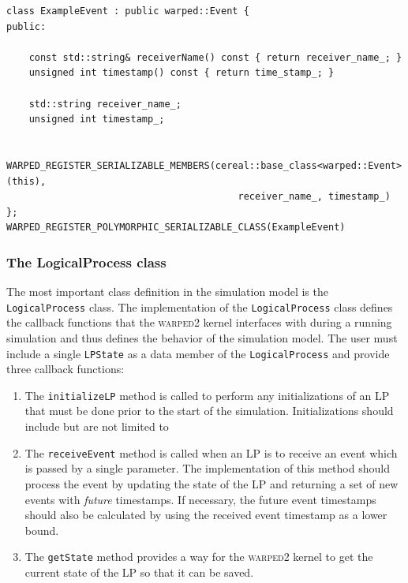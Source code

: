 \documentclass[11pt]{book}
\begin{document}
\begin{lstlisting}[caption=Example \textsc{warped2} Event Definition, label=event_example, float]
class ExampleEvent : public warped::Event {
public:

    const std::string& receiverName() const { return receiver_name_; }
    unsigned int timestamp() const { return time_stamp_; }

    std::string receiver_name_;
    unsigned int timestamp_;

    WARPED_REGISTER_SERIALIZABLE_MEMBERS(cereal::base_class<warped::Event>(this),
                                         receiver_name_, timestamp_)
};
WARPED_REGISTER_POLYMORPHIC_SERIALIZABLE_CLASS(ExampleEvent)
\end{lstlisting}

\subsubsection{The LogicalProcess class}

The most important class definition in the simulation model is the \texttt{LogicalProcess} class.
The implementation of the \texttt{LogicalProcess} class defines the callback functions that the
\textsc{warped2} kernel interfaces with during a running simulation and thus defines the behavior
of the simulation model. The user must include a single \texttt{LPState} as a data member of the
\texttt{LogicalProcess} and provide three callback functions:

\begin{enumerate}
    \item The \texttt{initializeLP} method is called to perform any initializations of an LP that
        must be done prior to the start of the simulation.  Initializations should include
        but are not limited to 
    \item The \texttt{receiveEvent} method is called when an LP is to receive an event which
        is passed by a single parameter.  The implementation of this method should process the
        event by updating the state of the LP and returning a set of new events with \emph{future}
        timestamps.  If necessary, the future event timestamps should also be calculated by using
        the received event timestamp as a lower bound.
    \item The \texttt{getState} method provides a way for the \textsc{warped2} kernel to get the
        current state of the LP so that it can be saved.
\end{enumerate}
\end{document}
